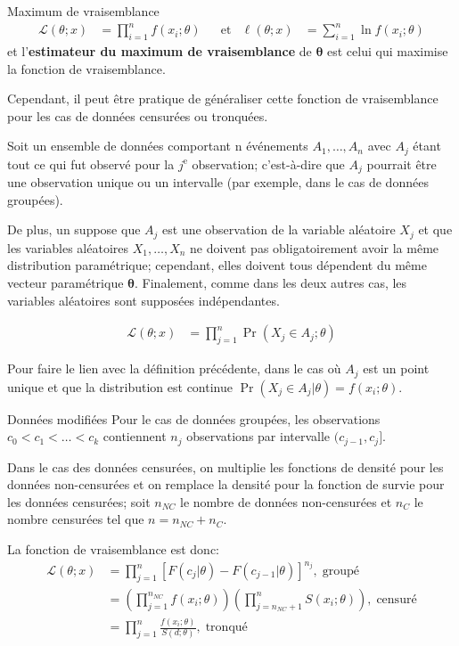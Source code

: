 \documentclass[10pt, french]{article}
\begin{document}
\begin{multicols*}{3}
\begin{algo}{Maximum de vraisemblance}
\setlength{\mathindent}{-1cm}
\begin{align*}
	\mathcal{L}(\theta; x)
	&=	\prod_{i = 1}^{n}	f(x_{i}; \theta)	&
	&\text{et}	&
	\ell(\theta; x)
	&=	\sum_{i = 1}^{n} \ln	f(x_{i}; \theta)	
\end{align*}
\setlength{\mathindent}{1cm}
et l'\textbf{estimateur du maximum de vraisemblance} de $\bm\theta$ est celui qui maximise la fonction de vraisemblance.
\end{algo}
Cependant, il peut être pratique de généraliser cette fonction de vraisemblance pour les cas de données censurées ou tronquées.

Soit un ensemble de données comportant n événements $A_{1}, \dots, A_{n}$ avec $A_{j}$ étant tout ce qui fut observé pour la $j^{\text{e}}$ observation; c'est-à-dire que $A_{j}$ pourrait être une observation unique ou un intervalle (par exemple, dans le cas de données groupées).

De plus, un suppose que $A_{j}$ est une observation de la variable aléatoire $X_{j}$ et que les variables aléatoires $X_{1}, \dots, X_{n}$ ne doivent pas obligatoirement avoir la même distribution paramétrique; cependant, elles doivent tous dépendent du même vecteur paramétrique $\bm\theta$.
Finalement, comme dans les deux autres cas, les variables aléatoires sont supposées indépendantes.

\begin{align*}
	\mathcal{L}(\theta; x)
	&=	\prod_{j = 1}^{n}	\Pr(X_{j} \in A_{j} ; \theta)		
\end{align*}

Pour faire le lien avec la définition précédente, dans le cas où $A_{j}$ est un point unique et que la distribution est continue $\Pr(X_{j} \in A_{j} | \theta) = f(x_{i}; \theta)$.

\begin{algo}{Données modifiées}
Pour le cas de données groupées, les observations $c_{0} < c_{1} < \dots < c_{k}$ contiennent $n_{j}$ observations par intervalle $(c_{j - 1}, c_{j}]$.

Dans le cas des données censurées, on multiplie les fonctions de densité pour les données non-censurées et on remplace la densité pour la fonction de survie pour les données censurées; soit $n_{NC}$ le nombre de données non-censurées et $n_{C}$ le nombre censurées tel que $n = n_{NC} + n_{C}$.

La fonction de vraisemblance est donc:
\setlength{\mathindent}{-1cm}
\begin{align*}
	\mathcal{L}(\theta; x)
	&=	\prod_{j = 1}^{n}	\left[ F(c_{j}|\theta) - F(c_{j-1}|\theta)\right]^{n_{j}},	\;	\text{groupé}	\\
	&=	\left(\prod_{j = 1}^{n_{NC}}f(x_{i}; \theta) \right)	\left(\prod_{j = n_{NC} + 1}^{n} S(x_{i} ; \theta) \right),	\;	\text{censuré}	\\
	&=	\prod_{j = 1}^{n}	\frac{f(x_{i}; \theta)}{S(d ; \theta)},	\;	\text{tronqué}
\end{align*}
\setlength{\mathindent}{1cm}
\end{algo}


\end{multicols*}
\end{document}
